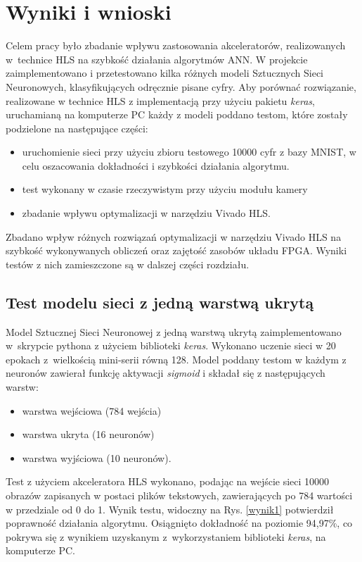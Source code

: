 \newpage %
\cleardoublepage %
\pagestyle{headings}

\section{Wyniki i wnioski}
Celem pracy było zbadanie wpływu zastosowania akceleratorów, realizowanych w~technice HLS na szybkość działania algorytmów ANN.
W projekcie zaimplementowano i przetestowano kilka różnych modeli Sztucznych Sieci Neuronowych, klasyfikujących odręcznie pisane cyfry. Aby porównać rozwiązanie, realizowane w technice HLS z implementacją przy użyciu pakietu \emph{keras}, uruchamianą na komputerze PC każdy z modeli poddano testom, które zostały podzielone na następujące części:
\begin{itemize}
  \item uruchomienie sieci przy użyciu zbioru testowego 10000 cyfr z bazy MNIST, w celu oszacowania dokładności i 
  szybkości działania algorytmu.
  \item test wykonany w czasie rzeczywistym przy użyciu modułu kamery
  \item zbadanie wpływu optymalizacji w narzędziu Vivado HLS.
\end{itemize}
Zbadano wpływ różnych rozwiązań optymalizacji w narzędziu Vivado HLS na szybkość wykonywanych obliczeń oraz zajętość zasobów układu FPGA.
Wyniki testów z nich zamieszczone są w dalszej części rozdziału.

\subsection{Test modelu sieci z jedną warstwą ukrytą}

Model Sztucznej Sieci Neuronowej z jedną warstwą ukrytą zaimplementowano w~skrypcie pythona z użyciem biblioteki \emph{keras}. Wykonano uczenie sieci w 20 epokach z~wielkością mini-serii równą 128.
Model poddany testom w każdym z neuronów zawierał funkcję aktywacji \emph{sigmoid} i składał się z następujących warstw: 
\begin{itemize}
  \item warstwa wejściowa (784 wejścia)
  \item warstwa ukryta (16 neuronów)
  \item warstwa wyjściowa (10 neuronów).
\end{itemize}

Test z użyciem akceleratora HLS wykonano, podając na wejście sieci 10000 obrazów zapisanych w postaci plików tekstowych, zawierających po 784 wartości w przedziale od 0 do 1. Wynik testu, widoczny na Rys. \ref{wynik1} potwierdził poprawność działania algorytmu. Osiągnięto dokładność na poziomie 94,97\%, co pokrywa się z wynikiem uzyskanym z~wykorzystaniem biblioteki \emph{keras}, na komputerze PC.


